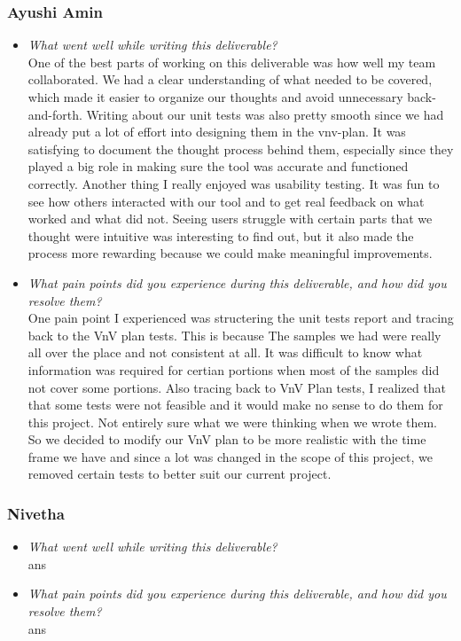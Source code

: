 \documentclass[12pt, titlepage]{article}
\begin{document}
\subsubsection*{Ayushi Amin}
\begin{itemize}
  \item \textit{What went well while writing this deliverable?} \\ 
  
  One of the best parts of working on this deliverable was how well my team collaborated. We had a clear understanding of what needed to be covered, which made it easier to organize our thoughts and avoid unnecessary back-and-forth. Writing about our unit tests was also pretty smooth since we had already put a lot of effort into designing them in the vnv-plan. 
  It was satisfying to document the thought process behind them, especially since they played a big role in making sure the tool was accurate and functioned correctly.
  Another thing I really enjoyed was usability testing. It was fun to see how others interacted with our tool and to get real feedback on what worked and what did not. Seeing users struggle with certain parts that we thought were intuitive was interesting to find out, but it also made the process more rewarding because we could make meaningful improvements.

  \item \textit{What pain points did you experience during this deliverable, and how did you resolve them?}\\ 
  
  One pain point I experienced was structering the unit tests report and tracing back to the VnV plan tests. This is because The samples we had were really all over the place and not consistent at all.
  It was difficult to know what information was required for certian portions when most of the samples did not cover some portions. Also tracing back to VnV Plan tests, I realized that that some tests were not
  feasible and it would make no sense to do them for this project. Not entirely sure what we were thinking when we wrote them. So we decided to modify our VnV plan to be more realistic with the time frame we have
  and since a lot was changed in the scope of this project, we removed certain tests to better suit our current project.
  
\end{itemize}

\subsubsection*{Nivetha}
\begin{itemize}
  \item \textit{What went well while writing this deliverable?} \\ 
  
  ans

  \item \textit{What pain points did you experience during this deliverable, and how did you resolve them?}\\ 
  
  ans
\end{itemize}
\end{document}
